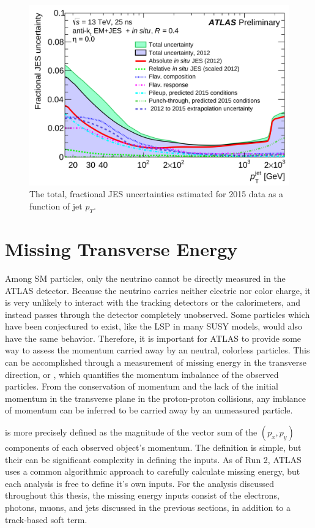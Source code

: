 \begin{figure}
\includegraphics[width=\fullfig]{figures/reco_jes_pt.png}
\caption{The total, fractional \ac{JES} uncertainties estimated for 2015 data as a function of jet $p_T$.}
\label{fig:reco_jesunc}
\end{figure}


\section{Missing Transverse Energy}
\label{sec:missing_energy}

Among \ac{SM} particles, only the neutrino cannot be directly measured in the \ac{ATLAS} detector. 
Because the neutrino carries neither electric nor color charge, it is very unlikely to interact with the tracking detectors or the calorimeters, and instead passes through the detector completely unobserved.
Some particles which have been conjectured to exist, like the \ac{LSP} in many \ac{SUSY} models, would also have the same behavior.
Therefore, it is important for \ac{ATLAS} to provide some way to assess the momentum carried away by an neutral, colorless particles.
This can be accomplished through a measurement of missing energy in the transverse direction, or \met, which quantifies the momentum imbalance of the observed particles.
From the conservation of momentum and the lack of the initial momentum in the transverse plane in the proton-proton collisions, any imblance of momentum can be inferred to be carried away by an unmeasured particle.

\met is more precisely defined as the magnitude of the vector sum of the $(p_x,p_y)$ components of each observed object's momentum.
The definition is simple, but their can be significant complexity in defining the inputs.
As of Run 2, \ac{ATLAS} uses a common algorithmic approach to carefully calculate missing energy, but each analysis is free to define it's own inputs.
For the analysis discussed throughout this thesis, the missing energy inputs consist of the electrons, photons, muons, and jets discussed in the previous sections, in addition to a track-based soft term.

